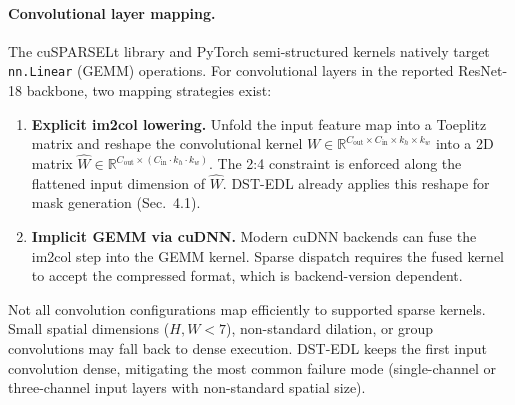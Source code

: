 \paragraph{Convolutional layer mapping.}
The cuSPARSELt library and PyTorch semi-structured kernels natively target
\texttt{nn.Linear} (GEMM) operations. For convolutional layers in the
reported ResNet-18 backbone, two mapping strategies exist:
\begin{enumerate}[leftmargin=*,itemsep=1pt,parsep=0pt]
    \item \textbf{Explicit im2col lowering.} Unfold the input feature map
          into a Toeplitz matrix and reshape the convolutional kernel
          $W\in\mathbb{R}^{C_{\mathrm{out}}\times C_{\mathrm{in}}\times
          k_h\times k_w}$ into a 2D matrix
          $\hat{W}\in\mathbb{R}^{C_{\mathrm{out}}\times
          (C_{\mathrm{in}}\cdot k_h\cdot k_w)}$. The 2:4 constraint is
          enforced along the flattened input dimension of $\hat{W}$. DST-EDL
          already applies this reshape for mask generation (Sec.~4.1).
    \item \textbf{Implicit GEMM via cuDNN.} Modern cuDNN backends can fuse
          the im2col step into the GEMM kernel. Sparse dispatch requires the
          fused kernel to accept the compressed format, which is
          backend-version dependent.
\end{enumerate}
Not all convolution configurations map efficiently to supported sparse
kernels. Small spatial dimensions ($H,W<7$), non-standard dilation, or group
convolutions may fall back to dense execution. DST-EDL keeps the first input
convolution dense, mitigating the most common failure mode (single-channel or
three-channel input layers with non-standard spatial size).

